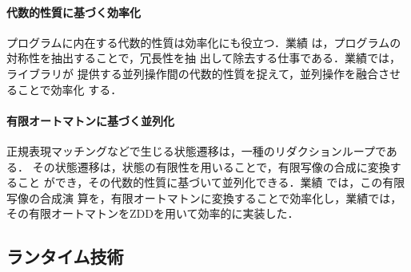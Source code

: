 \documentclass[dvipdfmx]{jsarticle}
\begin{document}
\paragraph{代数的性質に基づく効率化}
プログラムに内在する代数的性質は効率化にも役立つ．業績
\cite{splash19:nbody}は，プログラムの対称性を抽出することで，冗長性を抽
出して除去する仕事である．業績\cite{aplas09:gpu_skel}では，ライブラリが
提供する並列操作間の代数的性質を捉えて，並列操作を融合させることで効率化
する．

\paragraph{有限オートマトンに基づく並列化}
正規表現マッチングなどで生じる状態遷移は，一種のリダクションループである．
その状態遷移は，状態の有限性を用いることで，有限写像の合成に変換すること
ができ，その代数的性質に基づいて並列化できる．業績
\cite{ipdps21:plex,ppl22:sfa,ppl23c3:otf_sfa}では，この有限写像の合成演
算を，有限オートマトンに変換することで効率化し，業績\cite{ppl23:zdd}では，
その有限オートマトンをZDDを用いて効率的に実装した．

\subsection*{ランタイム技術}
\end{document}
